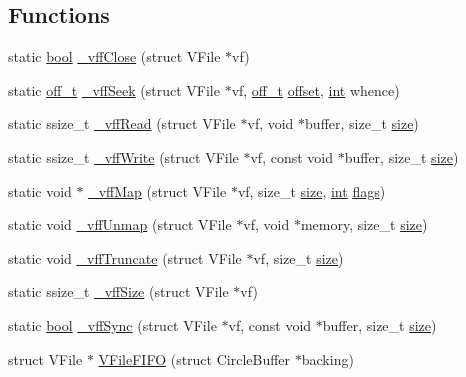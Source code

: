 \subsection*{Functions}
\begin{DoxyCompactItemize}
\item 
static \mbox{\hyperlink{libretro_8h_a4a26dcae73fb7e1528214a068aca317e}{bool}} \mbox{\hyperlink{vfs-fifo_8c_ad53bab40bd3ee7acea950d7810c214d9}{\+\_\+vff\+Close}} (struct V\+File $\ast$vf)
\item 
static \mbox{\hyperlink{__builder_8h_a53066be3c3a28d8b8ccb3dc95c1e49b1}{off\+\_\+t}} \mbox{\hyperlink{vfs-fifo_8c_a7e56f8b931c2f4d604b1060e0e641210}{\+\_\+vff\+Seek}} (struct V\+File $\ast$vf, \mbox{\hyperlink{__builder_8h_a53066be3c3a28d8b8ccb3dc95c1e49b1}{off\+\_\+t}} \mbox{\hyperlink{ioapi_8h_a601c4660e8a1a14a1b87fe387e934d19}{offset}}, \mbox{\hyperlink{ioapi_8h_a787fa3cf048117ba7123753c1e74fcd6}{int}} whence)
\item 
static ssize\+\_\+t \mbox{\hyperlink{vfs-fifo_8c_aebf7afd08be7a4e51c2ae0f17dde12f8}{\+\_\+vff\+Read}} (struct V\+File $\ast$vf, void $\ast$buffer, size\+\_\+t \mbox{\hyperlink{ioapi_8h_a014d89bd76f74ef3a29c8f04b473eb76}{size}})
\item 
static ssize\+\_\+t \mbox{\hyperlink{vfs-fifo_8c_a9edb7182cfa99285402b489ff82d31f5}{\+\_\+vff\+Write}} (struct V\+File $\ast$vf, const void $\ast$buffer, size\+\_\+t \mbox{\hyperlink{ioapi_8h_a014d89bd76f74ef3a29c8f04b473eb76}{size}})
\item 
static void $\ast$ \mbox{\hyperlink{vfs-fifo_8c_ae264af80ce9f8d7e855924166bbe3866}{\+\_\+vff\+Map}} (struct V\+File $\ast$vf, size\+\_\+t \mbox{\hyperlink{ioapi_8h_a014d89bd76f74ef3a29c8f04b473eb76}{size}}, \mbox{\hyperlink{ioapi_8h_a787fa3cf048117ba7123753c1e74fcd6}{int}} \mbox{\hyperlink{lr35902_2decoder_8c_a11f29eea941556f0630cfd3285f565c0}{flags}})
\item 
static void \mbox{\hyperlink{vfs-fifo_8c_a359856c1b2b58f1cb08c962ff0bbd6f7}{\+\_\+vff\+Unmap}} (struct V\+File $\ast$vf, void $\ast$memory, size\+\_\+t \mbox{\hyperlink{ioapi_8h_a014d89bd76f74ef3a29c8f04b473eb76}{size}})
\item 
static void \mbox{\hyperlink{vfs-fifo_8c_a44e1cdacc71a8e16868d8c968e644ec6}{\+\_\+vff\+Truncate}} (struct V\+File $\ast$vf, size\+\_\+t \mbox{\hyperlink{ioapi_8h_a014d89bd76f74ef3a29c8f04b473eb76}{size}})
\item 
static ssize\+\_\+t \mbox{\hyperlink{vfs-fifo_8c_af0919c50f70e8df2e12ca7fb437a0b4b}{\+\_\+vff\+Size}} (struct V\+File $\ast$vf)
\item 
static \mbox{\hyperlink{libretro_8h_a4a26dcae73fb7e1528214a068aca317e}{bool}} \mbox{\hyperlink{vfs-fifo_8c_ad31804a57b1b09d56fcefadca87ba2d1}{\+\_\+vff\+Sync}} (struct V\+File $\ast$vf, const void $\ast$buffer, size\+\_\+t \mbox{\hyperlink{ioapi_8h_a014d89bd76f74ef3a29c8f04b473eb76}{size}})
\item 
struct V\+File $\ast$ \mbox{\hyperlink{vfs-fifo_8c_af4228c6570572950e85b27b5315eec75}{V\+File\+F\+I\+FO}} (struct Circle\+Buffer $\ast$backing)
\end{DoxyCompactItemize}


